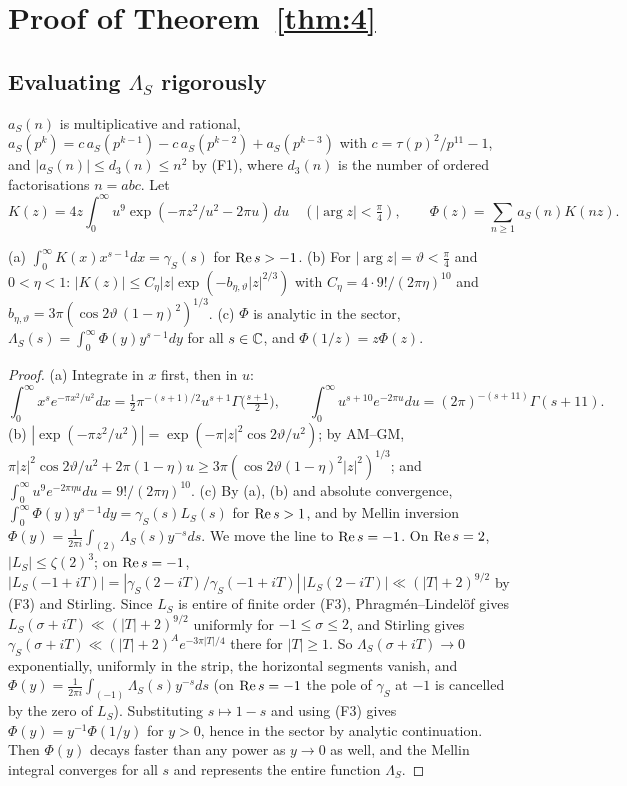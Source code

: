 \section{Proof of Theorem~\ref{thm:4}}\label{sec:proof4}

\subsection{Evaluating \texorpdfstring{$\Lambda_S$}{Lambda\_S} rigorously}
$a_S(n)$ is multiplicative and rational, $a_S(p^k)=c\,a_S(p^{k-1})-c\,a_S(p^{k-2})+a_S(p^{k-3})$ with $c=\tau(p)^2/p^{11}-1$, and $|a_S(n)|\le d_3(n)\le n^2$ by (F1), where $d_3(n)$ is the number of ordered factorisations $n=abc$. Let
\[
K(z)=4z\int_0^\infty u^9\exp(-\pi z^2/u^2-2\pi u)\,du\quad(|\arg z|<\tfrac\pi4),\qquad\Phi(z)=\sum_{n\ge1}a_S(n)K(nz).
\]

\begin{lemma}\label{lem:V0}
\textup{(a)} $\int_0^\infty K(x)x^{s-1}dx=\gamma_S(s)$ for $\operatorname{Re} s>-1$. \textup{(b)} For $|\arg z|=\vartheta<\frac\pi4$ and $0<\eta<1$: $|K(z)|\le C_\eta|z|\exp(-b_{\eta,\vartheta}|z|^{2/3})$ with $C_\eta=4\cdot9!/(2\pi\eta)^{10}$ and $b_{\eta,\vartheta}=3\pi(\cos2\vartheta\,(1-\eta)^2)^{1/3}$. \textup{(c)} $\Phi$ is analytic in the sector, $\Lambda_S(s)=\int_0^\infty\Phi(y)y^{s-1}dy$ for all $s\in\mathbb C$, and $\Phi(1/z)=z\Phi(z)$.
\end{lemma}

\begin{proof}
(a) Integrate in $x$ first, then in $u$:
\[
\int_0^\infty x^se^{-\pi x^2/u^2}dx=\tfrac12\pi^{-(s+1)/2}u^{s+1}\Gamma\bigl(\tfrac{s+1}2\bigr),\qquad\int_0^\infty u^{s+10}e^{-2\pi u}du=(2\pi)^{-(s+11)}\Gamma(s+11).
\] (b) $|\exp(-\pi z^2/u^2)|=\exp(-\pi|z|^2\cos2\vartheta/u^2)$; by AM--GM, $\pi|z|^2\cos2\vartheta/u^2+2\pi(1-\eta)u\ge3\pi(\cos2\vartheta(1-\eta)^2|z|^2)^{1/3}$; and $\int_0^\infty u^9e^{-2\pi\eta u}du=9!/(2\pi\eta)^{10}$. (c) By (a), (b) and absolute convergence, $\int_0^\infty\Phi(y)y^{s-1}dy=\gamma_S(s)L_S(s)$ for $\operatorname{Re} s>1$, and by Mellin inversion $\Phi(y)=\frac1{2\pi i}\int_{(2)}\Lambda_S(s)y^{-s}ds$. We move the line to $\operatorname{Re} s=-1$. On $\operatorname{Re} s=2$, $|L_S|\le\zeta(2)^3$; on $\operatorname{Re} s=-1$, $|L_S(-1+iT)|=|\gamma_S(2-iT)/\gamma_S(-1+iT)|\,|L_S(2-iT)|\ll(|T|+2)^{9/2}$ by (F3) and Stirling. Since $L_S$ is entire of finite order (F3), Phragm\'en--Lindel\"of gives $L_S(\sigma+iT)\ll(|T|+2)^{9/2}$ uniformly for $-1\le\sigma\le2$, and Stirling gives $\gamma_S(\sigma+iT)\ll(|T|+2)^Ae^{-3\pi|T|/4}$ there for $|T|\ge1$. So $\Lambda_S(\sigma+iT)\to0$ exponentially, uniformly in the strip, the horizontal segments vanish, and $\Phi(y)=\frac1{2\pi i}\int_{(-1)}\Lambda_S(s)y^{-s}ds$ (on $\operatorname{Re} s=-1$ the pole of $\gamma_S$ at $-1$ is cancelled by the zero of $L_S$). Substituting $s\mapsto1-s$ and using (F3) gives $\Phi(y)=y^{-1}\Phi(1/y)$ for $y>0$, hence in the sector by analytic continuation. Then $\Phi(y)$ decays faster than any power as $y\to0$ as well, and the Mellin integral converges for all $s$ and represents the entire function $\Lambda_S$.
\end{proof}

